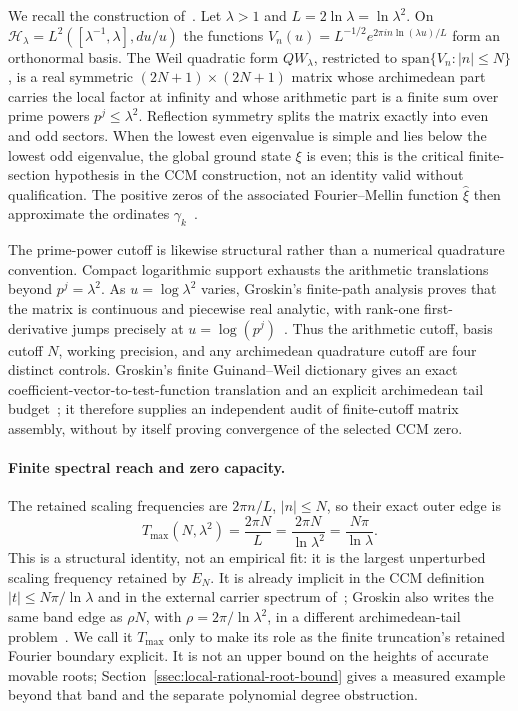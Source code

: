 \documentclass[11pt,a4paper]{article}
\begin{document}
We recall the construction of~\cite{CCM2025,CvS2025}. Let $\lambda>1$ and
$L=2\ln\lambda=\ln\lambda^2$. On $\mathcal H_\lambda=L^2([\lambda^{-1},\lambda],
du/u)$ the functions $V_n(u)=L^{-1/2}e^{2\pi i n\ln(\lambda u)/L}$ form an
orthonormal basis. The Weil quadratic form $QW_\lambda$, restricted to
$\mathrm{span}\{V_n:|n|\le N\}$, is a real symmetric $(2N{+}1)\times(2N{+}1)$
matrix whose archimedean part carries the local factor at infinity and whose
arithmetic part is a finite sum over prime powers $p^j\le\lambda^2$. Reflection
symmetry splits the matrix exactly into even and odd sectors. When the lowest
even eigenvalue is simple and lies below the lowest odd eigenvalue, the global
ground state $\xi$ is even; this is the critical finite-section hypothesis in
the CCM construction, not an identity valid without qualification. The
positive zeros of the associated Fourier--Mellin function $\widehat\xi$
then approximate the ordinates $\gamma_k$~\cite{CCM2025}.

The prime-power cutoff is likewise structural rather than a numerical
quadrature convention. Compact logarithmic support exhausts the arithmetic
translations beyond $p^j=\lambda^2$. As $u=\log\lambda^2$ varies, Groskin's
finite-path analysis proves that the matrix is continuous and piecewise real
analytic, with rank-one first-derivative jumps precisely at
$u=\log(p^j)$~\cite{GroskinMatrix2026}. Thus the arithmetic cutoff, basis
cutoff $N$, working precision, and any archimedean quadrature cutoff are four
distinct controls. Groskin's finite Guinand--Weil dictionary gives an exact
coefficient-vector-to-test-function translation and an explicit archimedean
tail budget~\cite{GroskinGW2026}; it therefore supplies an independent audit
of finite-cutoff matrix assembly, without by itself proving convergence of the
selected CCM zero.

\paragraph{Finite spectral reach and zero capacity.}
The retained scaling frequencies are $2\pi n/L$, $|n|\le N$, so their exact
outer edge is
\begin{equation}\label{eq:tmax}
  \boxed{\;T_{\max}(N,\lambda^2)=\frac{2\pi N}{L}
  =\frac{2\pi N}{\ln\lambda^2}=\frac{N\pi}{\ln\lambda}.\;}
\end{equation}
This is a structural identity, not an empirical fit: it is the largest
unperturbed scaling frequency retained by $E_N$. It is already implicit in the
CCM definition $|t|\le N\pi/\ln\lambda$ and in the external carrier spectrum
of~\cite[Sec.~5.6]{CCM2025}; Groskin also writes the same band edge as
$\rho N$, with $\rho=2\pi/\ln\lambda^2$, in a different archimedean-tail
problem~\cite{GroskinGW2026}. We call it $T_{\max}$ only to make its role as the
finite truncation's retained Fourier boundary explicit. It is not an
upper bound on the heights of accurate movable roots;
Section~\ref{ssec:local-rational-root-bound} gives a measured example
beyond that band and the separate polynomial degree obstruction.
\end{document}
